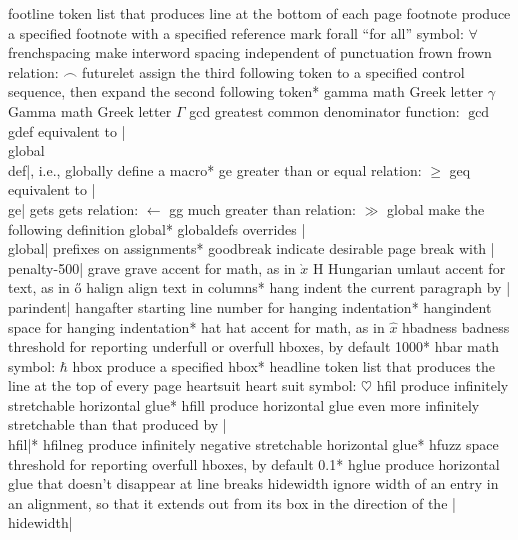 \capcs footline {token list that produces line at the bottom of each page}{}{}
\capcs footnote {produce a specified footnote 
   with a specified reference mark}{}{}
\capcs forall {``for all'' symbol: $\forall$}{}{}
\capcs frenchspacing {make interword spacing independent of punctuation}{}{}
\capcs frown {frown relation: $\frown$}{}{}
\capcs futurelet {assign the third following token to a specified control
   sequence, then expand the second following token}*{}
\capcs gamma {math Greek letter $\gamma$}{}{}
\capcs Gamma {math Greek letter $\Gamma$}{}{}
\capcs gcd {greatest common denominator function: $\gcd$}{}{}
\capcs gdef {equivalent to |\\global\\def|, i.e., globally define a macro}*{}
\capcs ge {greater than or equal relation: $\ge$}{}{}
\capcs geq {equivalent to |\\ge|}{}{}
\capcs gets {gets relation: $\gets$}{}{}
\capcs gg {much greater than relation: $\gg$}{}{}
\capcs global {make the following definition global}*{}
\capcs globaldefs {overrides |\\global| prefixes on assignments}*{}
\capcs goodbreak {indicate desirable page break with |\\penalty-500|}{}{}
\capcs grave {grave accent for math, as in $\grave x$}{}{}
\capcs H {Hungarian umlaut accent for text, as in \H o}{}{}
\capcs halign {align text in columns}*{}
\capcs hang {indent the current paragraph by |\\parindent|}{}{}
\capcs hangafter {starting line number for hanging indentation}*{}
\capcs hangindent {space for hanging indentation}*{}
\capcs hat {hat accent for math, as in $\hat x$}{}{}
\capcs hbadness {badness threshold for reporting underfull or overfull
   hboxes, by default 1000}*{}
\capcs hbar {math symbol: $\hbar$}{}{}
\capcs hbox {produce a specified hbox}*{}
\capcs headline {token list that produces the line at the
   top of every page}{}{}
\capcs heartsuit {heart suit symbol: $\heartsuit$}{}{}
\capcs hfil {produce infinitely stretchable horizontal glue}*{}
\capcs hfill {produce horizontal glue even more infinitely stretchable
   than that produced by |\\hfil|}*{}
\capcs hfilneg {produce infinitely negative stretchable horizontal glue}*{}
\capcs hfuzz {space threshold for reporting overfull hboxes, by default 
   0.1\pt}*{}
\capcs hglue {produce horizontal glue that doesn't disappear at line 
   breaks}{}{}
\capcs hidewidth {ignore width of an entry in an alignment, so that it
   extends out from its box in the direction of the |\\hidewidth|}{}{}
